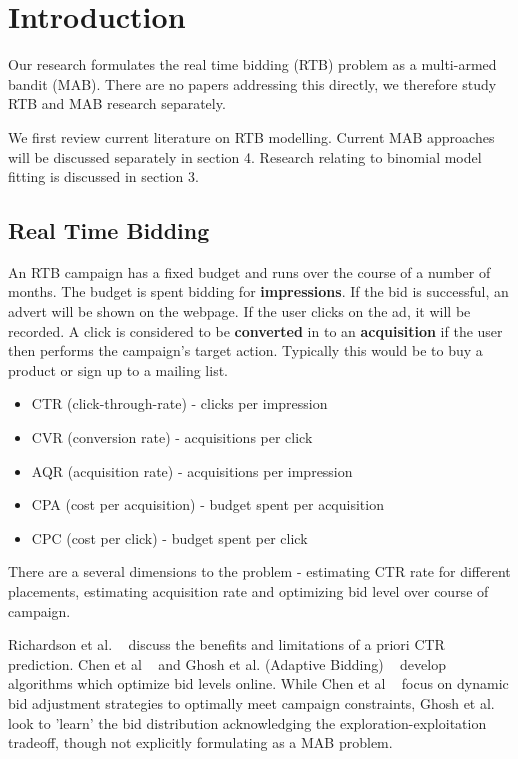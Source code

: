 \documentclass[11pt,a4,singlespacing,titlepagenumber=on]{scrreprt}
\numberwithin{equation}{chapter} %
\theoremstyle{remark}
\begin{document}
\chapter{Introduction}

Our research formulates the real time bidding (RTB) problem as a multi-armed bandit (MAB). There are no papers addressing this directly, we therefore study RTB and MAB research separately. 

We first review current literature on RTB modelling. Current MAB approaches will be discussed separately in section 4. Research relating to binomial model fitting is discussed in section 3.


\section{Real Time Bidding}

An RTB campaign has a fixed budget and runs over the course of a number of months. The budget is spent bidding for \textbf{impressions}. If the bid is successful, an advert will be shown on the webpage. If the user clicks on the ad, it will be recorded. A click is considered to be \textbf{converted} in to an \textbf{acquisition} if the user then performs the campaign's target action. Typically this would be to buy a product or sign up to a mailing list.

\begin{itemize}
	\item CTR (click-through-rate) - clicks per impression
	\item CVR (conversion rate) - acquisitions per click 
	\item AQR (acquisition rate) - acquisitions per impression
	\item CPA (cost per acquisition) - budget spent per acquisition
	\item CPC (cost per click) - budget spent per click
\end{itemize}

There are a several dimensions to the problem - estimating CTR rate for different placements, estimating acquisition rate and optimizing bid level over course of campaign.

Richardson et al. ~\cite{Richardson:2007:PCE:1242572.1242643} discuss the benefits and limitations of a priori CTR prediction. Chen et al ~\cite{Chen:2011:RBA:2020408.2020604} and Ghosh et al. (Adaptive Bidding) ~\cite{Ghosh:2009:ABD:1526709.1526744} develop algorithms which optimize bid levels online. While Chen et al ~\cite{Chen:2011:RBA:2020408.2020604} focus on dynamic bid adjustment strategies to optimally meet campaign constraints, Ghosh et al. ~\cite{raey} look to 'learn' the bid distribution acknowledging the exploration-exploitation tradeoff, though not explicitly formulating as a MAB problem.
\end{document}
